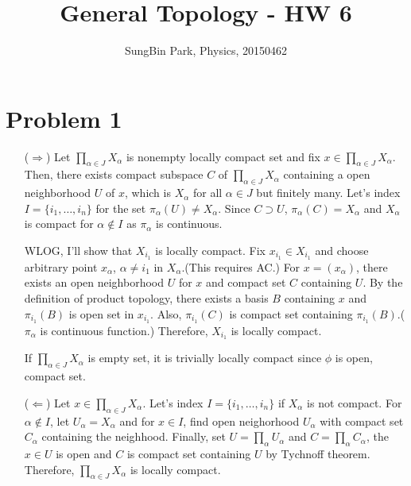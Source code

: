 \documentclass{article}
\begin{document}
\title{General Topology - HW 6}
\author{SungBin Park, Physics, 20150462} 

 \maketitle
\section*{Problem 1}
\begin{enumerate}
\item[($\Rightarrow$)] Let $\prod_{\alpha\in J} X_\alpha$ is nonempty locally compact set and fix $x\in \prod_{\alpha\in J} X_\alpha$. Then, there exists compact subspace $C$ of $\prod_{\alpha\in J} X_\alpha$ containing a open neighborhood $U$ of $x$, which is $X_\alpha$ for all $\alpha\in J$ but finitely many. Let's index $I=\{i_1, \ldots, i_n\}$ for the set $\pi_\alpha(U)\neq X_\alpha$. Since $C\supset U$, $\pi_\alpha(C)=X_\alpha$ and $X_\alpha$ is compact for $\alpha\notin I$ as $\pi_\alpha$ is continuous.

WLOG, I'll show that $X_{i_1}$ is locally compact. Fix $x_{i_1}\in X_{i_1}$ and choose arbitrary point $x_\alpha$, $\alpha\neq i_1$ in $X_\alpha$.(This requires AC.) For $x=(x_\alpha)$, there exists an open neighborhood $U$ for $x$ and compact set $C$ containing $U$. By the definition of product topology, there exists a basis $B$ containing $x$ and $\pi_{i_1}(B)$ is open set in $x_{i_1}$. Also, $\pi_{i_1}(C)$ is compact set containing $\pi_{i_1}(B)$.($\pi_\alpha$ is continuous function.) Therefore, $X_{i_1}$ is locally compact.

If $\prod_{\alpha\in J} X_\alpha$ is empty set, it is trivially locally compact since $\phi$ is open, compact set.
\item[($\Leftarrow$)] Let $x\in\prod_{\alpha\in J} X_\alpha$. Let's index $I=\{i_1, \ldots, i_n\}$ if $X_\alpha$ is not compact. For $\alpha\notin I$, let $U_\alpha=X_\alpha$ and for $x\in I$, find open neighorhood $U_\alpha$ with compact set $C_\alpha$ containing the neighhood. Finally, set $U=\prod_\alpha U_\alpha$ and $C=\prod_\alpha C_\alpha$, the $x\in U$ is open and $C$ is compact set containing $U$ by Tychnoff theorem. Therefore, $\prod_{\alpha\in J} X_\alpha$ is locally compact.
\end{enumerate}
\end{document}
